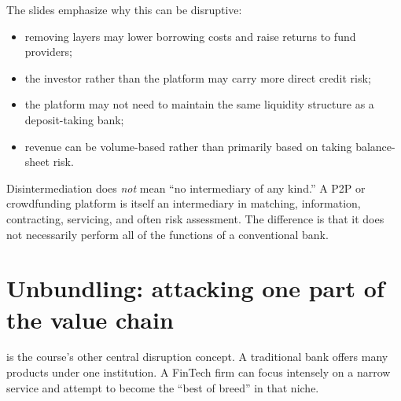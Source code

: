 The slides emphasize why this can be disruptive:

\begin{itemize}
  \item removing layers may lower borrowing costs and raise returns to fund providers;
  \item the investor rather than the platform may carry more direct credit risk;
  \item the platform may not need to maintain the same liquidity structure as a deposit-taking bank;
  \item revenue can be volume-based rather than primarily based on taking balance-sheet risk.
\end{itemize}

\begin{pitfall}
Disintermediation does \emph{not} mean ``no intermediary of any kind.'' A P2P or crowdfunding platform is itself an intermediary in matching, information, contracting, servicing, and often risk assessment. The difference is that it does not necessarily perform all of the functions of a conventional bank.
\end{pitfall}

\section{Unbundling: attacking one part of the value chain}

 is the course's other central disruption concept. A traditional bank offers many products under one institution. A FinTech firm can focus intensely on a narrow service and attempt to become the ``best of breed'' in that niche.

\begin{mlfigure}
\end{mlfigure}

